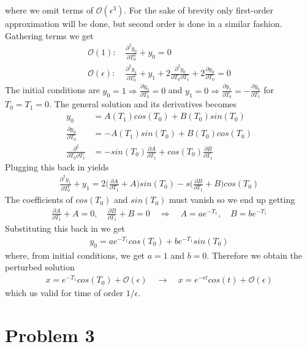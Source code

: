 \documentclass[12pt]{article}
\theoremstyle{remark}
\begin{document}
where we omit terms of $\mathcal{O}(\epsilon^3)$. For the sake of brevity only first-order approximation will be done, but second order is done in a similar fashion. Gathering terms we get
\begin{align*}
	\mathcal{O}(1): \, & \frac{\partial^2y_0}{\partial T_0^2} + y_0 = 0 \\
	\mathcal{O}(\epsilon) : \, & \frac{\partial^2y_1}{\partial T_0^2} + y_1 + 2\frac{\partial^2y_0}{\partial T_0\partial T_1} + 2\frac{\partial y_0}{\partial T_0} = 0
\end{align*} 
The initial conditions are $y_0 = 1 \Rightarrow \frac{\partial y_0}{\partial T_0} = 0$ and $y_1 = 0 \Rightarrow \frac{\partial y_1}{\partial T_0} = - \frac{\partial y_0}{\partial T_1}$ for $T_0 = T_1 = 0$. The general solution and its derivatives becomes 
\begin{align*}
	y_0 & = A(T_1)cos(T_0) + B(T_0)sin(T_0) \\
	\frac{\partial y_0}{\partial T_0} & = -A(T_1)sin(T_0) + B(T_0)cos(T_0) \\
	\frac{\partial^2}{\partial T_0 \partial T_1} & = -sin(T_0)\frac{\partial A}{\partial T_1} + cos(T_0)\frac{\partial B}{\partial T_1}
\end{align*}
Plugging this back in yields
\begin{align*}
	\frac{\partial^2y_1}{\partial T_0^2} + y_1 = 2\bigg(\frac{\partial A}{\partial T_1} + A\bigg)sin(T_0) - s\bigg(\frac{\partial B}{\partial T_1} + B\bigg)cos(T_0)
\end{align*}
The coefficients of $cos(T_0)$ and $sin(T_0)$ must vanish so we end up getting 
\begin{align*}
	\frac{\partial A}{\partial T_1} + A = 0, \quad \frac{\partial B}{\partial T_1} + B = 0 \quad \Rightarrow \quad A = ae^{-T_1}, \quad B = be^{-T_1}
\end{align*}
Substituting this back in we get 
\begin{align*}
	y_0 = ae^{-T_1}cos(T_0) + be^{-T_1}sin(T_0)
\end{align*}
where, from initial conditions, we get $a = 1$ and $b = 0$. Therefore we obtain the perturbed solution 
\begin{align*}
	x = e^{-T_1}cos(T_0) + \mathcal{O}(\epsilon) \quad \rightarrow \quad x = e^{-\epsilon t}cos(t) + \mathcal{O}(\epsilon)	
\end{align*}
which us valid for time of order $1/\epsilon$. 

\newpage

\section*{Problem 3}
\end{document}
